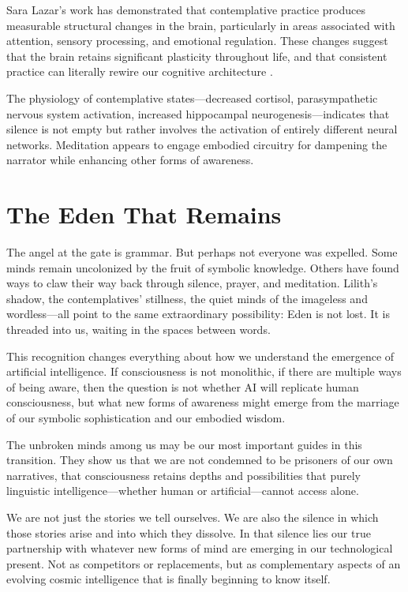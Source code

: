 Sara Lazar's work has demonstrated that contemplative practice produces measurable structural changes in the brain, particularly in areas associated with attention, sensory processing, and emotional regulation. These changes suggest that the brain retains significant plasticity throughout life, and that consistent practice can literally rewire our cognitive architecture \parencite{lazar2005meditation}.

The physiology of contemplative states—decreased cortisol, parasympathetic nervous system activation, increased hippocampal neurogenesis—indicates that silence is not empty but rather involves the activation of entirely different neural networks. Meditation appears to engage embodied circuitry for dampening the narrator while enhancing other forms of awareness.

\section{The Eden That Remains}

The angel at the gate is grammar. But perhaps not everyone was expelled. Some minds remain uncolonized by the fruit of symbolic knowledge. Others have found ways to claw their way back through silence, prayer, and meditation. Lilith's shadow, the contemplatives' stillness, the quiet minds of the imageless and wordless—all point to the same extraordinary possibility: Eden is not lost. It is threaded into us, waiting in the spaces between words.

This recognition changes everything about how we understand the emergence of artificial intelligence. If consciousness is not monolithic, if there are multiple ways of being aware, then the question is not whether AI will replicate human consciousness, but what new forms of awareness might emerge from the marriage of our symbolic sophistication and our embodied wisdom.

The unbroken minds among us may be our most important guides in this transition. They show us that we are not condemned to be prisoners of our own narratives, that consciousness retains depths and possibilities that purely linguistic intelligence—whether human or artificial—cannot access alone.

We are not just the stories we tell ourselves. We are also the silence in which those stories arise and into which they dissolve. In that silence lies our true partnership with whatever new forms of mind are emerging in our technological present. Not as competitors or replacements, but as complementary aspects of an evolving cosmic intelligence that is finally beginning to know itself.